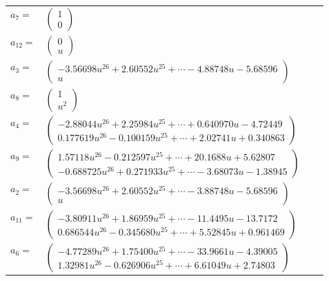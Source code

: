 \documentclass[1p]{elsarticle_modified}
\theoremstyle{definition}
\begin{document}
\begin{tabular}{m{7pt} m{180pt} m{7pt} m{180pt} }
\flushright $a_{7}=$&$\begin{pmatrix}1\\0\end{pmatrix}$ \\
\flushright $a_{12}=$&$\begin{pmatrix}0\\u\end{pmatrix}$ \\
\flushright $a_{3}=$&$\begin{pmatrix}-3.56698 u^{26}+2.60552 u^{25}+\cdots-4.88748 u-5.68596\\u\end{pmatrix}$ \\
\flushright $a_{8}=$&$\begin{pmatrix}1\\u^2\end{pmatrix}$ \\
\flushright $a_{4}=$&$\begin{pmatrix}-2.88044 u^{26}+2.25984 u^{25}+\cdots+0.640970 u-4.72449\\0.177619 u^{26}-0.100159 u^{25}+\cdots+2.02741 u+0.340863\end{pmatrix}$ \\
\flushright $a_{9}=$&$\begin{pmatrix}1.57118 u^{26}-0.212597 u^{25}+\cdots+20.1688 u+5.62807\\-0.688725 u^{26}+0.271933 u^{25}+\cdots-3.68073 u-1.38945\end{pmatrix}$ \\
\flushright $a_{2}=$&$\begin{pmatrix}-3.56698 u^{26}+2.60552 u^{25}+\cdots-3.88748 u-5.68596\\u\end{pmatrix}$ \\
\flushright $a_{11}=$&$\begin{pmatrix}-3.80911 u^{26}+1.86959 u^{25}+\cdots-11.4495 u-13.7172\\0.686544 u^{26}-0.345680 u^{25}+\cdots+5.52845 u+0.961469\end{pmatrix}$ \\
\flushright $a_{6}=$&$\begin{pmatrix}-4.77289 u^{26}+1.75400 u^{25}+\cdots-33.9661 u-4.39005\\1.32981 u^{26}-0.626906 u^{25}+\cdots+6.61049 u+2.74803\end{pmatrix}$ \\

\end{tabular}
\end{document}
